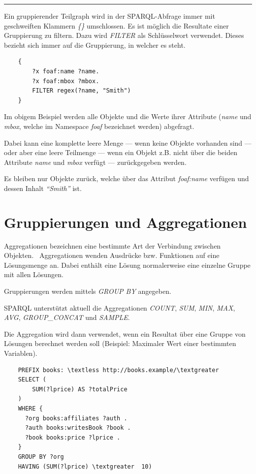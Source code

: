 \noindent\rule[1ex]{\textwidth}{1pt}

Ein gruppierender Teilgraph wird in der SPARQL-Abfrage immer mit geschweiften Klammern \textit{\{\}} umschlossen. Es ist möglich die Resultate einer Gruppierung zu filtern. Dazu wird \textit{FILTER} als Schlüsselwort verwendet. Dieses bezieht sich immer auf die Gruppierung, in welcher es steht.

\begin{lstlisting}
    {
        ?x foaf:name ?name.
        ?x foaf:mbox ?mbox.
        FILTER regex(?name, "Smith")
    }
\end{lstlisting}

Im obigem Beispiel werden alle Objekte und die Werte ihrer Attribute (\textit{name} und \textit{mbox}, welche im Namespace \textit{foaf} bezeichnet werden) abgefragt.

Dabei kann eine komplette leere Menge --- wenn keine Objekte vorhanden sind --- oder aber eine leere Teilmenge --- wenn ein Objekt z.B. nicht über die beiden Attribute \textit{name} und \textit{mbox} verfügt --- zurückgegeben werden.

Es bleiben nur Objekte zurück, welche über das Attribut \textit{foaf:name} verfügen und dessen Inhalt \textit{``Smith''} ist.

\section{Gruppierungen und Aggregationen}
\label{sec:sparql_gruppierungenaggregationen}
Aggregationen bezeichnen eine bestimmte Art der Verbindung zwischen Objekten.~\cite{wiki:aggregation} Aggregationen wenden Ausdrücke bzw. Funktionen auf eine Lösungsmenge an. Dabei enthält eine Lösung normalerweise eine einzelne Gruppe mit allen Lösungen.

Gruppierungen werden mittels \textit{GROUP BY} angegeben.

SPARQL unterstützt aktuell die Aggregationen \textit{COUNT}, \textit{SUM}, \textit{MIN}, \textit{MAX}, \textit{AVG}, \textit{GROUP\_CONCAT} und \textit{SAMPLE}.

Die Aggregation wird dann verwendet, wenn ein Resultat über eine Gruppe von Lösungen berechnet werden soll (Beispiel: Maximaler Wert einer bestimmten Variablen).

\lstset{language=SQL}
\begin{lstlisting}
    PREFIX books: \textless http://books.example/\textgreater 
    SELECT (
        SUM(?lprice) AS ?totalPrice
    )
    WHERE {
      ?org books:affiliates ?auth .
      ?auth books:writesBook ?book .
      ?book books:price ?lprice .
    }
    GROUP BY ?org
    HAVING (SUM(?lprice) \textgreater  10)
\end{lstlisting}
    
